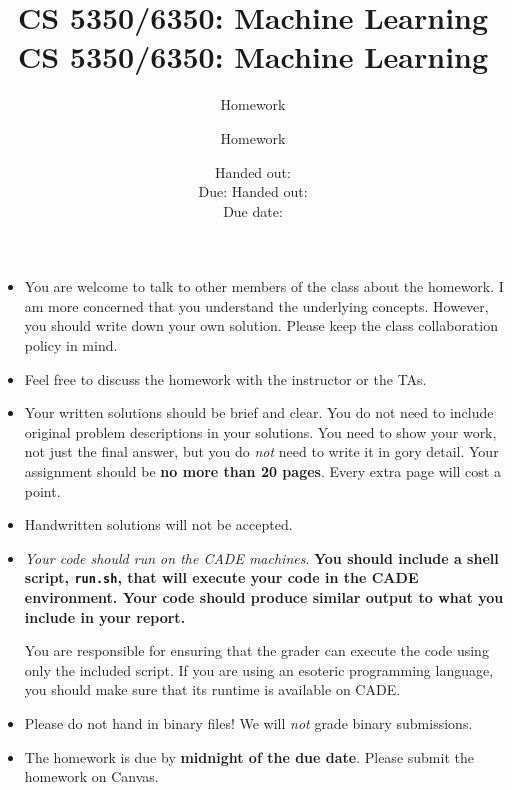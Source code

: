 \documentclass[12pt, fullpage,letterpaper]{article}
\title{CS 5350/6350: Machine Learning \semester}
\author{Homework \assignmentId}
\date{Handed out: \releaseDate\\
	Due: \dueDate}
\title{CS 5350/6350: Machine Learning \semester}
\author{Homework \assignmentId}
\date{Handed out: \releaseDate\\
  Due date: \dueDate}
\begin{document}
\maketitle


\newcommand{\Hcal}{\mathcal{H}} 
{\footnotesize
	\begin{itemize}
		\item You are welcome to talk to other members of the class about
		the homework. I am more concerned that you understand the
		underlying concepts. However, you should write down your own
		solution. Please keep the class collaboration policy in mind.
		
		\item Feel free to discuss the homework with the instructor or the TAs.
		
		\item Your written solutions should be brief and clear. You do not need to include original problem descriptions in your solutions. You need to
		show your work, not just the final answer, but you do \emph{not}
		need to write it in gory detail. Your assignment should be {\bf no
			more than 20 pages}. Every extra page will cost a point.
		
		\item Handwritten solutions will not be accepted.
		
		
		\item {\em Your code should run on the CADE machines}. \textbf{You should
		include a shell script, {\tt run.sh}, that will execute your code
		in the CADE environment. Your code should produce similar output to what you include in your report.}
		
		You are responsible for ensuring that the grader can execute the
		code using only the included script. If you are using an
		esoteric programming language, you should make sure that its
		runtime is available on CADE.
		
		\item Please do not hand in binary files! We will {\em not} grade
		binary submissions.
		
		\item The homework is due by \textbf{midnight of the due date}. Please submit
		the homework on Canvas.
		
	\end{itemize}
}
\end{document}
